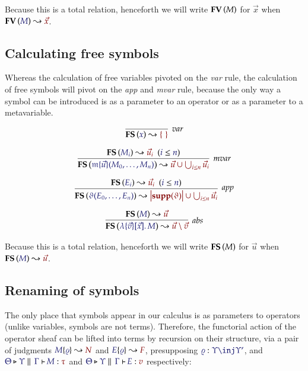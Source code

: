 \documentclass[11pt]{article}
\theoremstyle{definition}
\theoremstyle{remark}
\numberwithin{equation}{section}
\newcommand\Supp[1]{\mathbf{supp}(#1)}
\newcommand\CalcFV[2]{
  \FV{\IMode{#1}}\leadsto \OMode{#2}
}
\newcommand\CalcFS[2]{
  \FS{\IMode{#1}}\leadsto \OMode{#2}
}
\begin{document}
Because this is a total relation, henceforth we will write $\mathbf{FV}\left(M\right)$ for
$\vec{x}$ when $\CalcFV{M}{\vec{x}}$.

\subsection{Calculating free symbols}

Whereas the calculation of free variables pivoted on the \emph{var} rule, the
calculation of free symbols will pivot on the \emph{app} and \emph{mvar} rule,
because the only way a symbol can be introduced is as a parameter to an
operator or as a parameter to a metavariable.

\begin{gather*}
  \infer[\textit{var}]{
    \CalcFS{x}{\MkSet{}}
  }{
  }\\[6pt]
  \infer[\textit{mvar}]{
    \CalcFS{
      \MApp{\MV{m}}{\vec{u}}{M_0,\dots,M_n}
    }{
      \vec{u} \cup \bigcup_{i\leq n} \vec{u}_i
    }
  }{
    \HypJ{
      \CalcFS{M_i}{\vec{u}_i}
    }{
      \Leq{i}{n}
    }
  }\\[6pt]
  \infer[\textit{app}]{
    \CalcFS{
      \App{\vartheta}{E_0,\dots,E_n}
    }{
      \Dom{\Supp{\vartheta}} \cup \bigcup_{i\leq n} \vec{u}_i
    }
  }{
    \HypJ{
      \CalcFS{E_i}{\vec{u}_i}
    }{
      \Leq{i}{n}
    }
  }\\[6pt]
  \infer[\textit{abs}]{
    \CalcFS{
      \MkBTm{\vec{v}}{\vec{x}}{M}
    }{
      \vec{u}\setminus\vec{v}
    }
  }{
    \CalcFS{M}{\vec{u}}
  }
\end{gather*}

Because this is a total relation, henceforth we will write $\mathbf{FS}\left(M\right)$ for
$\vec{u}$ when $\CalcFS{M}{\vec{u}}$.


\subsection{Renaming of symbols}

The only place that symbols appear in our calculus is as parameters to operators
(unlike variables, symbols are not terms). Therefore, the functorial action of
the operator sheaf can be lifted into terms by recursion on their
structure, via a pair of judgments $\IsRenaming{\varrho}{M}{N}$ and
$\IsRenaming{\varrho}{E}{F}$, presupposing $\Of{\varrho}{\Upsilon\inj\Upsilon'}$,
and $\IsAbt{\Theta}{\Upsilon}{\Gamma}{M}{\tau}$ and
$\IsAbt{\Theta}{\Upsilon}{\Gamma}{E}{v}$ respectively:
\end{document}
